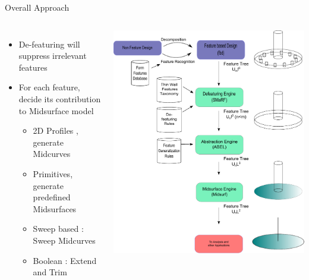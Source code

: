 \begin{frame}[<+-| alert@+>]{Overall Approach}

\begin{columns}[T]

	\begin{itemize}[noitemsep,label=\textbullet,topsep=2pt,parsep=2pt,partopsep=2pt]
	\item De-featuring will suppress irrelevant features
	\item For each feature, decide its contribution to Midsurface model
	\begin{itemize}[noitemsep,label=\textbullet,topsep=2pt,parsep=2pt,partopsep=2pt]
	\item 2D Profiles , generate Midcurves
	\item Primitives, generate predefined Midsurfaces
	\item Sweep based : Sweep Midcurves
	\item Boolean : Extend and Trim
	\end{itemize}
	\end{itemize}


	\includegraphics[scale=0.25]{../Common/images/SystemArchitecture1.pdf}

\end{columns}

\end{frame}
